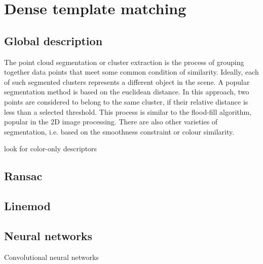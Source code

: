 \chapter{Dense template matching}
\label{cha:template}

\section{Global description}
\label{seq:global}

The point cloud segmentation or cluster extraction is the process of grouping together data points that meet some common condition of similarity. Ideally, each of such segmented clusters represents a different object in the scene. A popular segmentation method is based on the euclidean distance. In this approach, two points are considered to belong to the same cluster, if their relative distance is less than a selected threshold. This process is similar to the flood-fill algorithm, popular in the 2D image processing. There are also other varieties of segmentation, i.e. based on the smoothness constraint or colour similarity.

look for color-only descriptors

\section{Ransac}
\label{seq:ransac}


\section{Linemod}
\label{seq:linemod}


\section{Neural networks}
\label{seq:neural}

Convolutional neural networks